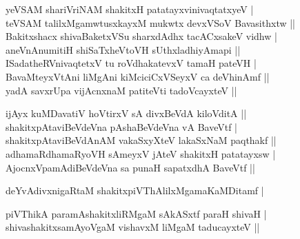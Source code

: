 \begin{entry}
\gl{}
\info{}{}{}{}
\begin{shl}
yeVSAM shariVriNAM shakitxH patatayxvinivaqtatxyeV |\\
teVSAM talilxMgamwtusxkayxM mukwtx devxVSoV Bavasithxtw ||\\
Bakitxshacx shivaBaketxVSu sharxdAdhx tacACxsakeV vidhw |\\
aneVnAnumitiH shiSaTxheVtoVH sUthxladhiyAmapi ||\\
ISadatheRVnivaqtetxV tu roVdhakatevxV tamaH pateVH |\\
BavaMteyxVtAni liMgAni kiMciciCxVSeyxV ca deVhinAmf ||\\
yadA savxrUpa vijAcnxnaM patiteVti tadoVcayxteV ||
\end{shl}
\end{entry}

\begin{entry}
\begin{shl}
ijAyx kuMDavatiV hoVtirxV sA divxBeVdA kiloVditA ||\\
shakitxpAtaviBeVdeVna pAshaBeVdeVna vA BaveVtf |\\
shakitxpAtaviBeVdAnAM vakaSxyXteV lakaSxNaM paqthakf ||\\
adhamaRdhamaRyoVH sAmeyxV jAteV shakitxH patatayxsw |\\
AjocnxVpamAdiBeVdeVna sa punaH sapatxdhA BaveVtf ||
\end{shl}
\end{entry}

\begin{entry}
\begin{shl}
deYvAdivxnigaRtaM shakitxpiVThAlilxMgamaKaMDitamf |
\end{shl}
\begin{shl}
piVThikA paramAshakitxliRMgaM sAkASxtf paraH shivaH |\\
shivashakitxsamAyoVgaM vishavxM liMgaM taducayxteV ||
\end{shl}
\end{entry}

